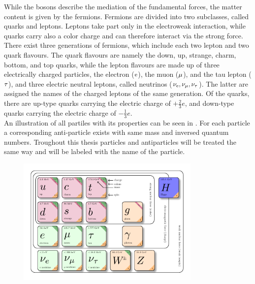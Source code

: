 While the bosons describe the mediation of the fundamental forces, the matter content is given by the fermions. Fermions are divided into two subclasses, called quarks and leptons. Leptons take part only in the electroweak interaction, while quarks carry also a color charge and can therefore interact via the strong force. There exist three generations of fermions, which include each two lepton and two quark flavours. The quark flavours are namely the down, up, strange, charm, bottom, and top quarks, while the lepton flavours are made up of three electrically charged particles, the electron ($\mathrm{e}$), the muon ($\mu$), and the tau lepton ($\tau$), and three electric neutral leptons, called neutrinos ($\nu_\mathrm{{e}},\nu_{\mu},\nu_{\tau}$). The latter are assigned the names of the charged leptons of the same generation. Of the quarks, there are up-type quarks carrying the electric charge of $+\frac{2}{3}e$, and down-type quarks carrying the electric charge of $-\frac{1}{3}e$.\\
An illustration of all partiles with its properties can be seen in .
For each particle a corresponding anti-particle exists with same mass and inversed quantum numbers. Troughout this thesis particles and antiparticles will be treated the same way and will be labeled with the name of the particle.\\

\begin{figure}[!htpb]
\centering
  \includegraphics[width=0.8\textwidth]{figures/general/SM}
  \label{fig:SM}
  \caption{}
\end{figure}


